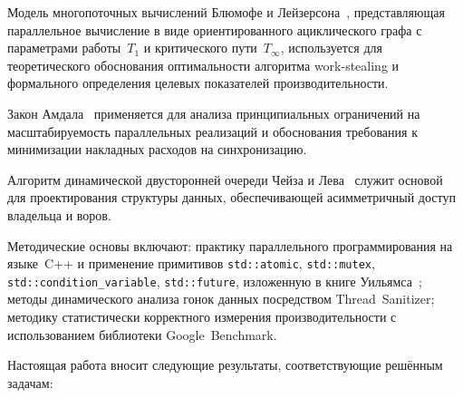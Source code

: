Модель многопоточных вычислений Блюмофе и
Лейзерсона~\cite{Blumofe1999}, представляющая параллельное вычисление в виде
ориентированного ациклического графа с параметрами работы~$T_1$ и критического
пути~$T_\infty$, используется для теоретического обоснования оптимальности
алгоритма work-stealing и формального определения целевых показателей
производительности.

Закон Амдала~\cite{Amdahl1967} применяется для анализа
принципиальных ограничений на масштабируемость параллельных реализаций и
обоснования требования к минимизации накладных расходов на синхронизацию.

Алгоритм динамической двусторонней очереди Чейза и
Лева~\cite{Chase2005} служит основой для проектирования структуры данных,
обеспечивающей асимметричный доступ владельца и воров.

Методические основы включают: практику параллельного программирования
на языке~C++ и применение примитивов \texttt{std::atomic},
\texttt{std::mutex}, \texttt{std::condition\_variable},
\texttt{std::future}, изложенную в книге Уильямса~\cite{Williams2019};
методы динамического анализа гонок данных посредством Thread~Sanitizer;
методику статистически корректного измерения производительности с использованием
библиотеки Google~Benchmark.

Настоящая работа вносит следующие результаты, соответствующие решённым задачам:

